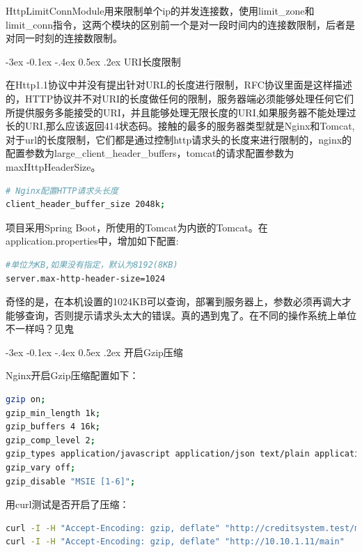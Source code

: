 \documentclass[12pt]{book}
\makeatletter
\numberwithin{dummy}{section}
\theoremstyle{ocrenumbox}
\theoremstyle{blacknumex}
\theoremstyle{blacknumbox}
\theoremstyle{ocrenum}
\renewcommand{\subsection}{\@startsection {subsection}{2}{\z@}
	{-3ex \@plus -0.1ex \@minus -.4ex}
	{0.5ex \@plus.2ex }
	{\normalfont\sffamily\bfseries}}
\makeatother
\begin{document}
HttpLimitConnModule用来限制单个ip的并发连接数，使用limit\_zone和limit\_conn指令，这两个模块的区别前一个是对一段时间内的连接数限制，后者是对同一时刻的连接数限制。

\subsection{URI长度限制}

在Http1.1协议中并没有提出针对URL的长度进行限制，RFC协议里面是这样描述的，HTTP协议并不对URI的长度做任何的限制，服务器端必须能够处理任何它们所提供服务多能接受的URI，并且能够处理无限长度的URI,如果服务器不能处理过长的URI,那么应该返回414状态码。接触的最多的服务器类型就是Nginx和Tomcat,对于url的长度限制，它们都是通过控制http请求头的长度来进行限制的，nginx的配置参数为large\_client\_header\_buffers，tomcat的请求配置参数为maxHttpHeaderSize。

\begin{lstlisting}[language=bash]
# Nginx配置HTTP请求头长度
client_header_buffer_size 2048k;
\end{lstlisting}

项目采用Spring Boot，所使用的Tomcat为内嵌的Tomcat。在application.properties中，增加如下配置:

\begin{lstlisting}[language=bash]
#单位为KB,如果没有指定，默认为8192(8KB)
server.max-http-header-size=1024
\end{lstlisting}

奇怪的是，在本机设置的1024KB可以查询，部署到服务器上，参数必须再调大才能够查询，否则提示请求头太大的错误。真的遇到鬼了。在不同的操作系统上单位不一样吗？见鬼

\subsection{开启Gzip压缩}

Nginx开启Gzip压缩配置如下：

\begin{lstlisting}[language=Bash]
gzip on;
gzip_min_length 1k;
gzip_buffers 4 16k;
gzip_comp_level 2;
gzip_types application/javascript application/json text/plain application/x-javascript text/css application/xml text/javascript application/x-httpd-php image/jpeg image/gif image/png;
gzip_vary off;
gzip_disable "MSIE [1-6]";
\end{lstlisting}

用curl测试是否开启了压缩：

\begin{lstlisting}[language=Bash]
curl -I -H "Accept-Encoding: gzip, deflate" "http://creditsystem.test/main"
curl -I -H "Accept-Encoding: gzip, deflate" "http://10.10.1.11/main"
\end{lstlisting}
\end{document}
